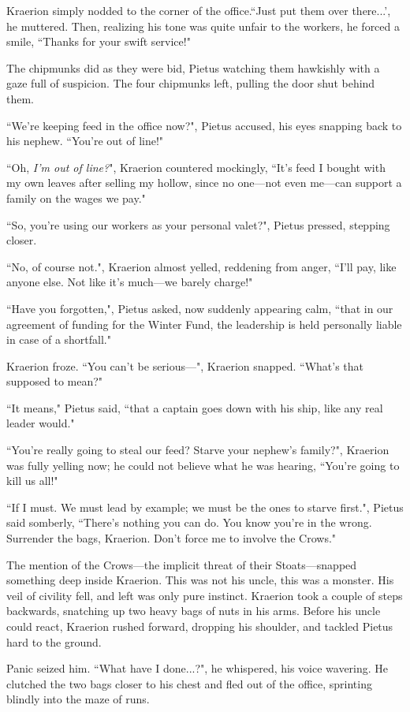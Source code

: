 Kraerion simply nodded to the corner of the office.``Just put them over there...', he muttered. Then, realizing his tone was quite unfair to the workers, he forced a smile, ``Thanks for your swift service!"

The chipmunks did as they were bid, Pietus watching them hawkishly with a gaze full of suspicion. The four chipmunks left, pulling the door shut behind them.

``We're keeping feed in the office now?", Pietus accused, his eyes snapping back to his nephew. ``You're out of line!"

``Oh, \textit{I'm out of line?}", Kraerion countered mockingly, ``It's feed I bought with my own leaves after selling my hollow, since no one---not even me---can support a family on the wages we pay."

``So, you're using our workers as your personal valet?", Pietus pressed, stepping closer.

``No, of course not.", Kraerion almost yelled, reddening from anger, ``I'll pay, like anyone else. Not like it's much---we barely charge!"

``Have you forgotten,", Pietus asked, now suddenly appearing calm, ``that in our agreement of funding for the Winter Fund, the leadership is held personally liable in case of a shortfall."

Kraerion froze. ``You can't be serious---", Kraerion snapped. ``What's that supposed to mean?"

``It means," Pietus said, ``that a captain goes down with his ship, like any real leader would."

``You're really going to steal our feed? Starve your nephew's family?", Kraerion was fully yelling now; he could not believe what he was hearing, ``You're going to kill us all!"

``If I must. We must lead by example; we must be the ones to starve first.", Pietus said somberly, ``There's nothing you can do. You know you're in the wrong. Surrender the bags, Kraerion. Don't force me to involve the Crows."

The mention of the Crows---the implicit threat of their Stoats---snapped something deep inside Kraerion. This was not his uncle, this was a monster. His veil of civility fell, and left was only pure instinct. Kraerion took a couple of steps backwards, snatching up two heavy bags of nuts in his arms. Before his uncle could react, Kraerion rushed forward, dropping his shoulder, and tackled Pietus hard to the ground.

Panic seized him. ``What have I done...?", he whispered, his voice wavering. He clutched the two bags closer to his chest and fled out of the office, sprinting blindly into the maze of runs.